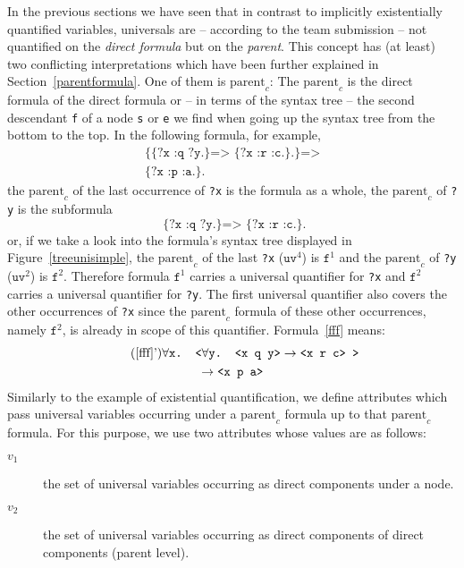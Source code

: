 In the previous sections we have seen that in contrast to implicitly existentially quantified variables, 
universals are -- according to the \wwwc team submission -- not quantified on the \emph{direct formula}
but on the \emph{parent}.
This concept has (at least) two conflicting interpretations which have been further explained in 
Section~\ref{parentformula}. One of them is $\text{parent}_c$:  %
The $\text{parent}_c$ is the direct formula of the direct formula or -- in terms of the syntax tree -- the second descendant \texttt{f} of a node \texttt{s} or 
\texttt{e} we find when going up the syntax tree from the bottom to the top.
In the following formula, for example,
\begin{multline}\label{fff}
\texttt{\{\{?x :q ?y.\} => \{?x :r :c.\}.\} =>}\\
\texttt{\{?x :p :a.\}.}
\end{multline}
the $\text{parent}_c$ of the last occurrence of \texttt{?x} is the formula as a whole,
the $\text{parent}_c$ of \texttt{?y} is the subformula
\[
 \texttt{ \{?x :q ?y.\} => \{?x :r :c.\}.}
\]
or, if we take a look into the formula's syntax tree displayed in Figure~\ref{treeunisimple}, 
the $\text{parent}_c$ of the last \texttt{?x} ($\texttt{uv}^4$) is $\texttt{f}^1$ and 
the $\text{parent}_c$ of \texttt{?y} ($\texttt{uv}^2$) is
$\texttt{f}^2$. Therefore formula $\texttt{f}^1$ carries a universal quantifier for \texttt{?x} and $\texttt{f}^2$ carries a universal quantifier for \texttt{?y}.
The first universal quantifier also covers the other occurrences of \texttt{?x} since the $\text{parent}_c$ formula of these
other occurrences, namely $\texttt{f}^2$, is already 
in scope of this quantifier. %
Formula~\ref{fff} means:
\begin{multline}\tag{\ref{fff}'}\label{iall}
 \forall \texttt{x. } \texttt{<} \forall \texttt{y. <x q y>} \rightarrow \texttt{<x r c> >}\\ \rightarrow \texttt{<x p a>}
\end{multline}
Similarly to the example of existential quantification, 
we define attributes which pass universal variables occurring under a $\text{parent}_c$ formula up to that $\text{parent}_c$ formula. 
For this purpose, we use two attributes whose values are as follows:
\begin{description}
 \item[$v_1$]  the set of universal variables occurring as direct components under a node.
 \item[$v_2$]  the set of universal variables occurring as direct components of direct components (parent level).
\end{description}
